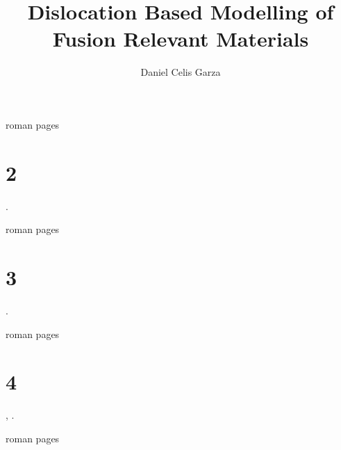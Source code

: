 
\title{Dislocation Based Modelling of Fusion Relevant Materials}
\author{Daniel Celis Garza}

\maketitle
\onehalfspacing



\begin{romanpages}
	roman pages
\end{romanpages}
\chapter{2}
 \cite{greenwade93}.
\savearabiccounter
\begin{romanpages}
	roman pages
\end{romanpages}
\chapter{3}
 \cite{greenwade93}.
\savearabiccounter
\begin{romanpages}
	roman pages
\end{romanpages}
\chapter{4}
, \cite{greenwade93}.
\savearabiccounter
\begin{romanpages}
	roman pages
\end{romanpages}
%



